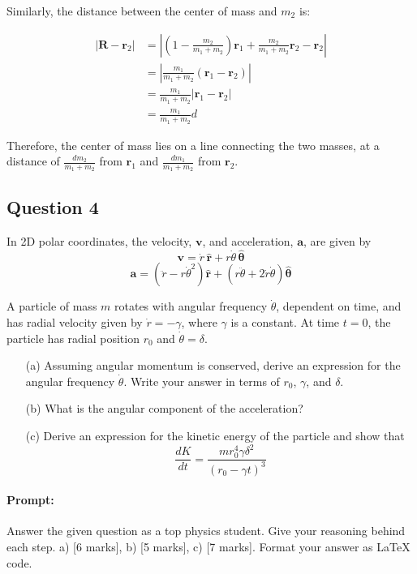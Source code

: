 \documentclass{article}
\begin{document}
Similarly, the distance between the center of mass and $m_2$ is:

\begin{align*}
|\mathbf{R} - \mathbf{r}_2| &= \left| \left( 1 - \frac{m_2}{m_1 + m_2} \right) \mathbf{r}_1 + \frac{m_2}{m_1 + m_2} \mathbf{r}_2 - \mathbf{r}_2 \right| \\
&= \left| \frac{m_1}{m_1 + m_2} (\mathbf{r}_1 - \mathbf{r}_2) \right| \\
&= \frac{m_1}{m_1 + m_2} |\mathbf{r}_1 - \mathbf{r}_2| \\
&= \frac{m_1}{m_1 + m_2} d
\end{align*}

Therefore, the center of mass lies on a line connecting the two masses, at a distance of $\frac{dm_2}{m_1 + m_2}$ from $\mathbf{r}_1$ and $\frac{dm_1}{m_1 + m_2}$ from $\mathbf{r}_2$.

\subsection{Question 4}

In 2D polar coordinates, the velocity, \( \mathbf{v} \), and acceleration, \( \mathbf{a} \), are given by
\[
\mathbf{v} = \dot{r} \, \hat{\mathbf{r}} + r \dot{\theta} \, \hat{\boldsymbol{\theta}}
\]
\[
\mathbf{a} = \left( \ddot{r} - r \dot{\theta}^2 \right) \hat{\mathbf{r}} + \left( r \ddot{\theta} + 2 \dot{r} \dot{\theta} \right) \hat{\boldsymbol{\theta}}
\]

A particle of mass \( m \) rotates with angular frequency \( \dot{\theta} \), dependent on time, and has radial velocity given by \( \dot{r} = -\gamma \), where \( \gamma \) is a constant. At time \( t = 0 \), the particle has radial position \( r_0 \) and \( \dot{\theta} = \delta \).

\begin{itemize}
    \item[(a)] Assuming angular momentum is conserved, derive an expression for the angular frequency \( \dot{\theta} \). Write your answer in terms of \( r_0 \), \( \gamma \), and \( \delta \).
    \item[(b)] What is the angular component of the acceleration?
    \item[(c)] Derive an expression for the kinetic energy of the particle and show that
    \[
    \frac{dK}{dt} = \frac{m r_0^4 \gamma \delta^2}{(r_0 - \gamma t)^3}
    \]
\end{itemize}

\paragraph{Prompt: \\} 
Answer the given question as a top physics student. Give your reasoning behind each step. a) [6 marks], b) [5 marks], c) [7 marks].
Format your answer as LaTeX code.
\end{document}
